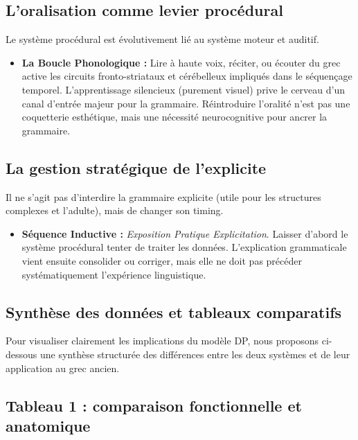 \subsection{L'oralisation comme levier procédural}

Le système procédural est évolutivement lié au système moteur et auditif.

\begin{itemize}\item \textbf{La Boucle Phonologique :} Lire à haute voix, réciter, ou écouter du grec active les circuits fronto-striataux et cérébelleux impliqués dans le séquençage temporel. L'apprentissage silencieux (\og purement visuel\fg{}) prive le cerveau d'un canal d'entrée majeur pour la grammaire. Réintroduire l'oralité n'est pas une coquetterie esthétique, mais une nécessité neurocognitive pour ancrer la grammaire.\end{itemize}

\subsection{La gestion stratégique de l'explicite}

Il ne s'agit pas d'interdire la grammaire explicite (utile pour les structures complexes et
l'adulte), mais de changer son timing.

\begin{itemize}\item \textbf{Séquence Inductive :} \textit{Exposition \-\> Pratique \-\> Explicitation}. Laisser d'abord le système procédural tenter de traiter les données. L'explication grammaticale vient ensuite consolider ou corriger, mais elle ne doit pas précéder systématiquement l'expérience linguistique.\end{itemize}

\subsection{Synthèse des données et tableaux comparatifs}

Pour visualiser clairement les implications du modèle DP, nous proposons ci-dessous une synthèse
structurée des différences entre les deux systèmes et de leur application au grec ancien.



\subsection{Tableau 1 : comparaison fonctionnelle et anatomique}

